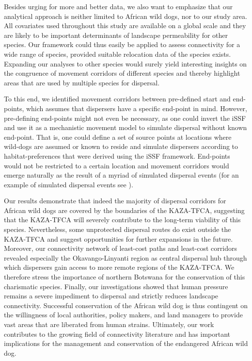 \documentclass[abstract=on,10pt,a4paper,bibliography=totocnumbered]{scrartcl}
\begin{document}
Besides urging for more and better data, we also want to emphasize that our
analytical approach is neither limited to African wild dogs, nor to our study
area. All covariates used throughout this study are available on a global scale
and they are likely to be important determinants of landscape permeability for
other species. Our framework could thus easily be applied to assess connectivity
for a wide range of species, provided suitable relocation data of the species
exists. Expanding our analyses to other species would surely yield interesting
insights on the congruence of movement corridors of different species and
thereby highlight areas that are used by multiple species for dispersal.

To this end, we identified movement corridors between pre-defined start and
end-points, which assumes that dispersers have a specific end-point in mind.
However, pre-defining end-points might not even be necessary, as one could
invert the iSSF and use it as a mechanistic movement model to simulate dispersal
without known end-point. That is, one could define a set of source points at
locations where wild-dogs are assumed or known to reside and simulate dispersers
according to habitat-preferences that were derived using the iSSF framework.
End-points would not be restricted to a certain location and movement corridors
would emerge naturally as the result of a myriad of simulated dispersal events
(for an example of simulated dispersal events see
).

Our results demonstrate that indeed the majority of dispersal corridors for
African wild dogs are covered by the boundaries of the KAZA-TFCA, suggesting
that the KAZA-TFCA will severely contribute to the long-term viability of this
species. Nevertheless, some unprotected dispersal routes do exist outside the
KAZA-TFCA and suggest opportunities for further expansions in the future.
Moreover, our connectivity network of least-cost paths and least-cost corridors
revealed especially the Okavango-Linyanti region as central dispersal hub
through which dispersers gain access to more remote regions of the KAZA-TFCA. We
therefore stress the importance of northern Botswana for the conservation of
this charismatic species. Finally, our investigations showed that human pressure
remains a severe impediment to dispersal and strictly reduces landscape
connectivity. Successful conservation of the African wild dog is thus contingent
on the willingness of local authorities, policy makers, and land managers to
provide vast areas that are liberated from human strains. Ultimately, our work
contributes to the growing field of connectivity literature and has important
implications for the management and conservation of the endangered African wild
dog.
\end{document}
